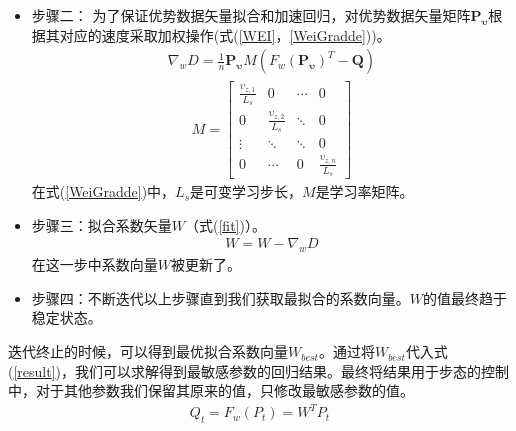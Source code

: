 \begin{itemize}
	\item 步骤二： 为了保证优势数据矢量拟合和加速回归，对优势数据矢量矩阵$\bm{P_{\upsilon}}$根据其对应的速度采取加权操作(式(\ref{WEI}，\ref{WeiGradde}))。
	\begin{eqnarray}\label{WEI}
	\nabla_{w}D=\frac{1}{n}\bm{P_{\upsilon}}M(F_{w}(\bm{P_{\upsilon}})^{T}-\bm{Q})
	\end{eqnarray}
	\begin{eqnarray}\label{WeiGradde}
	M=\begin{bmatrix}
	\frac{\upsilon_{z,1}}{L_{s}}&0&\cdots&0\\
	0&\frac{\upsilon_{z,2}}{L_{s}}&\ddots&0\\
	\vdots&\ddots&\ddots&0\\
	0&\cdots&0&\frac{\upsilon_{z,n}}{L_{s}}
	\end{bmatrix}
	\end{eqnarray}
	在式(\ref{WeiGradde})中，$L_s$是可变学习步长，$M$是学习率矩阵。
	
	\item 步骤三：拟合系数矢量$W$（式(\ref{fit})）。
	\begin{eqnarray}\label{fit}
	W=W-\nabla_{w}D
	\end{eqnarray}
	在这一步中系数向量$W$被更新了。
	
	\item 步骤四：不断迭代以上步骤直到我们获取最拟合的系数向量。$W$的值最终趋于稳定状态。
\end{itemize}

迭代终止的时候，可以得到最优拟合系数向量$W_{best}$。通过将$W_{best}$代入式(\ref{result})，我们可以求解得到最敏感参数的回归结果。最终将结果用于步态的控制中，对于其他参数我们保留其原来的值，只修改最敏感参数的值。
\begin{eqnarray}\label{result}
Q_{t} = F_{w}(P_{t})=W^{T}P_{t}
\end{eqnarray}